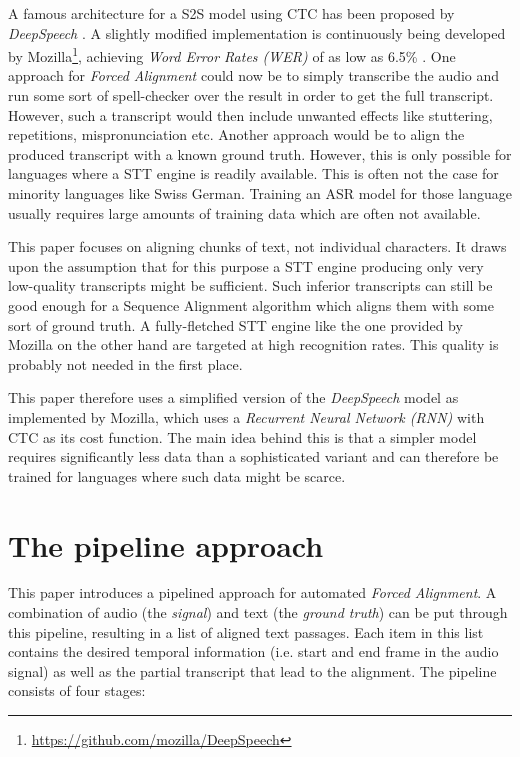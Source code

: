\documentclass[letterpaper]{article}
\begin{document}
A famous architecture for a S2S model using CTC has been proposed by \textit{DeepSpeech} \parencite{deepspeech}. A slightly modified implementation is continuously being developed by Mozilla\footnote{\url{https://github.com/mozilla/DeepSpeech}}, achieving \textit{Word Error Rates (WER)} of as low as 6.5\% \parencite{mozillajourney}. One approach for \textit{Forced Alignment} could now be to simply transcribe the audio and run some sort of spell-checker over the result in order to get the full transcript. However, such a transcript would then include unwanted effects like stuttering, repetitions, mispronunciation etc. Another approach would be to align the produced transcript with a known ground truth. However, this is only possible for languages where a STT engine is readily available. This is often not the case for minority languages like Swiss German. Training an ASR model for those language usually requires large amounts of training data which are often not available.

This paper focuses on aligning chunks of text, not individual characters. It draws upon the assumption that for this purpose a STT engine producing only very low-quality transcripts might be sufficient. Such inferior transcripts can still be good enough for a Sequence Alignment algorithm which aligns them with some sort of ground truth. A fully-fletched STT engine like the one provided by Mozilla on the other hand are targeted at high recognition rates. This quality is probably not needed in the first place. 

This paper therefore uses a simplified version of the \textit{DeepSpeech} model as implemented by Mozilla, which uses a \textit{Recurrent Neural Network (RNN)} with CTC as its cost function. The main idea behind this is that a simpler model requires significantly less data than a sophisticated variant and can therefore be trained for languages where such data might be scarce.

\section{The pipeline approach}

This paper introduces a pipelined approach for automated \textit{Forced Alignment}. A combination of audio (the \textit{signal}) and text (the \textit{ground truth}) can be put through this pipeline, resulting in a list of aligned text passages. Each item in this list contains the desired temporal information (i.e. start and end frame in the audio signal) as well as the partial transcript that lead to the alignment. The pipeline consists of four stages:
\end{document}
